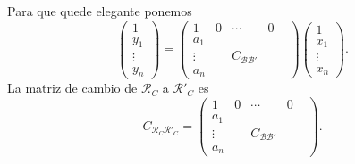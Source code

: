 Para que quede elegante ponemos 
\[\begin{pmatrix} 1 \\ y_{1} \\ \vdots \\ y_{n} \end{pmatrix} = \begin{pmatrix} 1 & 0 & \cdots & 0 \\
a_{1} & & & \\
\vdots & & C_{\mathcal{B}\mathcal{B}'} & \\
a_{n} & & & & \end{pmatrix}\begin{pmatrix} 1 \\ x_{1} \\ \vdots \\ x_{n} \end{pmatrix} .\]
La matriz de cambio de $\displaystyle \mathcal{R}_{C} $ a $\displaystyle \mathcal{R}'_{C} $ es 
\[C_{\mathcal{R}_{C}\mathcal{R}'_{C}} = \begin{pmatrix} 1 & 0 & \cdots & 0 \\
a_{1} & & & \\
\vdots & & C_{\mathcal{B}\mathcal{B}'} & \\
a_{n} & & & & \end{pmatrix} .\]
